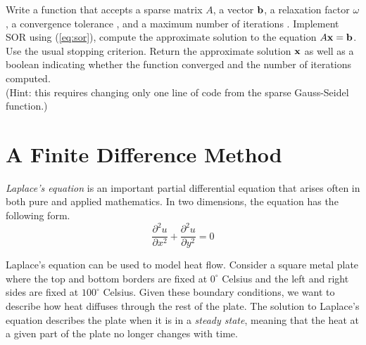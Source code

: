 \begin{problem} %
Write a function that accepts a sparse matrix $A$, a vector $\mathbf{b}$, a relaxation factor $\omega$, a convergence tolerance , and a maximum number of iterations .
Implement SOR using (\ref{eq:sor}), compute the approximate solution to the equation $A\mathbf{x} = \mathbf{b}$.
Use the usual stopping criterion.
Return the approximate solution $\mathbf{x}$ as well as a boolean indicating whether the function converged and the number of iterations computed.
\\ (Hint: this requires changing only one line of code from the sparse Gauss-Seidel function.)
\label{prob:sor}
\end{problem}

\section*{A Finite Difference Method} %

\emph{Laplace's equation} is an important partial differential equation that arises often in both pure and applied mathematics.
In two dimensions, the equation has the following form.
\begin{equation}
\frac{\partial^2 u}{\partial x^2} + \frac{\partial^2 u}{\partial y^2} = 0
\label{eq:laplaces-equation}
\end{equation}

Laplace's equation can be used to model heat flow.
Consider a square metal plate where the top and bottom borders are fixed at $0^\circ$ Celsius and the left and right sides are fixed at $100^\circ$ Celsius.
Given these boundary conditions, we want to describe how heat diffuses through the rest of the plate.
The solution to Laplace's equation describes the plate when it is in a \emph{steady state}, meaning that the heat at a given part of the plate no longer changes with time.

